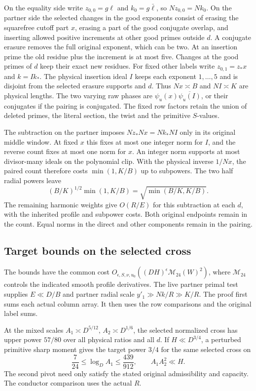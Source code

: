 On the equality side write \(z_{0,0}=g\ell\) and \(k_0=g\bar\ell\), so
\(Nz_{0,0}=Nk_0\). On the partner side the selected changes in the good
exponents consist of erasing the squarefree cutoff part \(x\), erasing a
part of the good conjugate overlap, and inserting allowed positive
increments at other good primes outside \(d\). A conjugate erasure removes
the full original exponent, which can be two. At an insertion prime the
old residue plus the increment is at most five. Changes at the good
primes of \(d\) keep their exact new residues. For fixed other labels
write \(z_{0,1}=z_*x\) and \(k=Ik_*\). The physical insertion ideal \(I\)
keeps each exponent \(1,\ldots,5\) and is disjoint from the selected
erasure supports and \(d\). Thus \(Nx\asymp B\) and \(NI\asymp K\) are
physical lengths. The two varying raw phases are
\(\psi_u(x)\overline{\psi_u(I)}\), or their conjugates if the pairing is
conjugated. The fixed row factors retain the union of deleted primes,
the literal section, the twist and the primitive \(S\)-values.

The subtraction on the partner imposes \(Nz_*Nx=Nk_*NI\) only in its
original middle window. At fixed \(x\) this fixes at most one integer
norm for \(I\), and the reverse count fixes at most one norm for \(x\).
An integer norm supports at most divisor-many ideals on the polynomial
clip. With the physical inverse \(1/Nx\), the paired count therefore
costs \(\min(1,K/B)\) up to subpowers. The two half radial powers leave
\[
 (B/K)^{1/2}\min(1,K/B)=\sqrt{\min(B/K,K/B)} .
\]
The remaining harmonic weights give \(O(R/E)\) for this subtraction at
each \(d\), with the inherited profile and subpower costs. Both original
endpoints remain in the count. Equal norms in the direct and other
components remain in the pairing.

\subsection{Target bounds on the selected cross}\label{pca:bounds}
The bounds have the common cost
\(O_{\epsilon,S,\nu,u_0}((DH)^\epsilon\mathcal M_{24}(W)^2)\), where
\(\mathcal M_{24}\) controls the indicated smooth profile derivatives.
The live partner primal test supplies \(E\ll D/B\) and partner radial
scale \(y'_1\gg Nk/R\gg K/R\). The proof first sums each actual column
array. It then uses the row comparisons and the original label sums.

At the mixed scales \(A_1\asymp D^{5/12},\, A_2\asymp D^{1/6}\), the
selected normalized cross has upper power \(57/80\) over all physical
ratios and all \(d\). If \(H\ll D^{3/4}\), a perturbed primitive sharp
moment gives the target power \(3/4\) for the same selected cross on
\[
 \frac7{24}\le\log_D A_1\le\frac{439}{912},\qquad
 A_1A_2^2\ll H.
\]
The second pivot need only satisfy the stated original admissibility
and capacity. The conductor comparison uses the actual \(R\).


